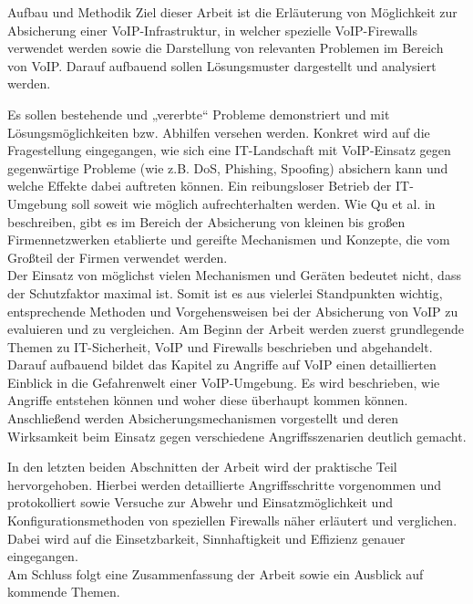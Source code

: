 \label{Aufbau und Methodik}
\begin{section}{Aufbau und Methodik}
Ziel dieser Arbeit ist die Erläuterung von Möglichkeit zur Absicherung einer VoIP-Infrastruktur, 
in welcher spezielle VoIP-Firewalls verwendet werden sowie die Darstellung von relevanten 
Problemen im Bereich von VoIP. Darauf aufbauend sollen Lösungsmuster dargestellt und analysiert werden. 

Es sollen bestehende und „vererbte“ Probleme demonstriert und mit Lösungsmöglichkeiten bzw. Abhilfen versehen werden. 
Konkret wird auf die Fragestellung eingegangen, wie sich eine IT-Landschaft mit VoIP-Einsatz gegen gegenwärtige Probleme (wie z.B. DoS, Phishing, Spoofing) absichern kann und welche Effekte dabei auftreten können. Ein reibungsloser Betrieb der IT-Umgebung soll soweit wie möglich aufrechterhalten werden.
Wie Qu et al. in \cite{Qu:2009:desactv}  beschreiben, gibt es im Bereich der Absicherung von kleinen bis großen Firmennetzwerken  etablierte und gereifte Mechanismen und Konzepte, die vom Großteil der Firmen verwendet werden. 
\\
Der Einsatz von möglichst vielen Mechanismen und Geräten bedeutet nicht, dass der Schutzfaktor maximal ist. Somit ist es aus vielerlei Standpunkten wichtig, entsprechende Methoden und Vorgehensweisen bei der Absicherung von VoIP zu evaluieren und zu vergleichen.
Am Beginn der Arbeit werden zuerst grundlegende Themen zu IT-Sicherheit, VoIP und Firewalls beschrieben und abgehandelt. Darauf aufbauend bildet das Kapitel zu Angriffe auf VoIP einen detaillierten Einblick in die Gefahrenwelt einer VoIP-Umgebung. Es wird beschrieben, wie Angriffe entstehen können und woher diese überhaupt kommen können. Anschließend werden  Absicherungsmechanismen vorgestellt und deren Wirksamkeit beim Einsatz gegen verschiedene Angriffsszenarien deutlich gemacht.

In den letzten beiden Abschnitten der Arbeit wird der praktische Teil hervorgehoben. Hierbei werden detaillierte Angriffsschritte vorgenommen und protokolliert sowie Versuche zur Abwehr und Einsatzmöglichkeit und Konfigurationsmethoden von speziellen Firewalls näher erläutert und verglichen. Dabei wird auf die Einsetzbarkeit, Sinnhaftigkeit und Effizienz genauer eingegangen.
\\
Am Schluss folgt eine Zusammenfassung der Arbeit sowie ein Ausblick auf kommende Themen.
\pagebreak



\end{section}
